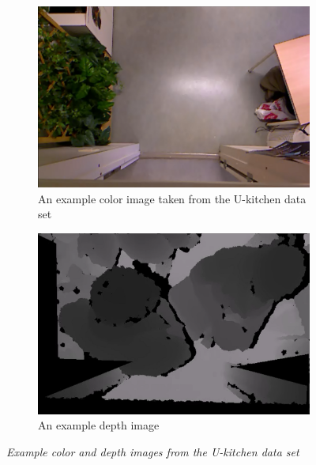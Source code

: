\begin{figure}[H]
\centering
\begin{subfigure}{.5\textwidth}
  \centering
  \includegraphics[width=0.9\linewidth]{images/U-Kitchen-color.png}
  \caption{An example color image taken from the U-kitchen data set}
  \label{fig:sub1}
\end{subfigure}%
\begin{subfigure}{.5\textwidth}
  \centering
  \includegraphics[width=0.9\linewidth]{images/UFolk.png}
  \caption{An example depth image}
  \label{fig:sub2}
\end{subfigure}
\caption[R-kitchen exits]{\textit{Example color and depth images from the U-kitchen data set}}
\label{fig:U-kitchen example}
\end{figure}

